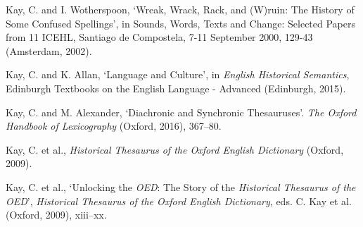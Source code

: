 \begin{list}{}




\item %
Kay, C. and I. Wotherspoon, `Wreak, Wrack, Rack, and (W)ruin: The History of Some Confused Spellings', in Sounds, Words, Texts and Change: Selected Papers from 11 ICEHL, Santiago de Compostela, 7-11 September 2000, 129-43 (Amsterdam, 2002).

\item %
Kay, C. and K. Allan, `Language and Culture', in \textit{English Historical Semantics}, Edinburgh Textbooks on the English Language - Advanced (Edinburgh, 2015).

\item %
Kay, C. and M. Alexander, `Diachronic and Synchronic Thesauruses'. \textit{The Oxford Handbook of Lexicography} (Oxford, 2016), 367–80.

\item
Kay, C. et al., \textit{Historical Thesaurus of the Oxford English Dictionary} (Oxford, 2009).

\item %
Kay, C. et al., `Unlocking the \textit{OED}: The Story of the \textit{Historical Thesaurus of the OED}', \textit{Historical Thesaurus of the Oxford English Dictionary}, eds. C. Kay et al. (Oxford, 2009), xiii–xx.



\end{list}
